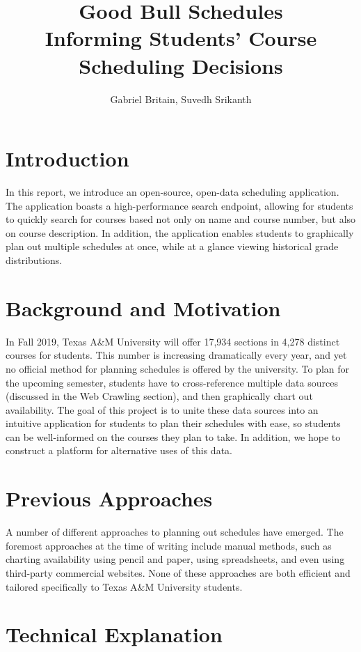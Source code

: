 \documentclass{article}
\title{Good Bull Schedules \\\small{Informing Students' Course Scheduling Decisions}}
\author{Gabriel Britain, Suvedh Srikanth}
\date{}
\begin{document}
\maketitle

\section{Introduction}

In this report, we introduce an open-source, open-data scheduling application. The application boasts a high-performance search endpoint, allowing for students to quickly search for courses based not only on name and course number, but also on course description. In addition, the application enables students to graphically plan out multiple schedules at once, while at a glance viewing historical grade distributions.

\section{Background and Motivation}

In Fall 2019, Texas A\&M University will offer 17,934 sections in 4,278 distinct courses for students. This number is increasing dramatically every year, and yet no official method for planning schedules is offered by the university. To plan for the upcoming semester, students have to cross-reference multiple data sources (discussed in the Web Crawling section), and then graphically chart out availability. The goal of this project is to unite these data sources into an intuitive application for students to plan their schedules with ease, so students can be well-informed on the courses they plan to take. In addition, we hope to construct a platform for alternative uses of this data.

\section{Previous Approaches}
A number of different approaches to planning out schedules have emerged. The foremost approaches at the time of writing include manual methods, such as charting availability using pencil and paper, using spreadsheets, and even using third-party commercial websites. None of these approaches are both efficient and tailored specifically to Texas A\&M University students.

\section{Technical Explanation}
\end{document}

